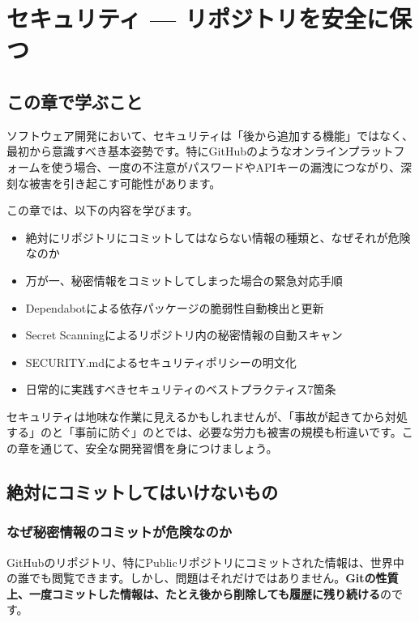 \chapter{セキュリティ --- リポジトリを安全に保つ}

\section{この章で学ぶこと}

ソフトウェア開発において、セキュリティは「後から追加する機能」ではなく、最初から意識すべき基本姿勢です。特にGitHubのようなオンラインプラットフォームを使う場合、一度の不注意がパスワードやAPIキーの漏洩につながり、深刻な被害を引き起こす可能性があります。

この章では、以下の内容を学びます。

\begin{itemize}
  \item 絶対にリポジトリにコミットしてはならない情報の種類と、なぜそれが危険なのか
  \item 万が一、秘密情報をコミットしてしまった場合の緊急対応手順
  \item Dependabotによる依存パッケージの脆弱性自動検出と更新
  \item Secret Scanningによるリポジトリ内の秘密情報の自動スキャン
  \item SECURITY.mdによるセキュリティポリシーの明文化
  \item 日常的に実践すべきセキュリティのベストプラクティス7箇条
\end{itemize}

セキュリティは地味な作業に見えるかもしれませんが、「事故が起きてから対処する」のと「事前に防ぐ」のとでは、必要な労力も被害の規模も桁違いです。この章を通じて、安全な開発習慣を身につけましょう。

\section{絶対にコミットしてはいけないもの}

\subsection{なぜ秘密情報のコミットが危険なのか}

GitHubのリポジトリ、特にPublicリポジトリにコミットされた情報は、世界中の誰でも閲覧できます。しかし、問題はそれだけではありません。\textbf{Gitの性質上、一度コミットした情報は、たとえ後から削除しても履歴に残り続ける}のです。

